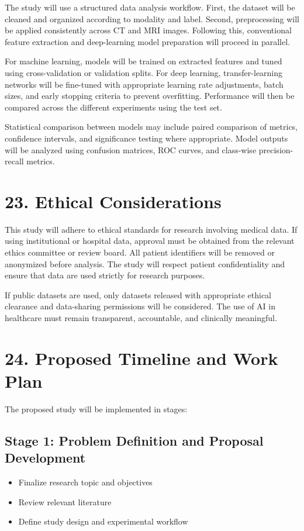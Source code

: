 \documentclass[12pt,a4paper]{report}
\begin{document}
The study will use a structured data analysis workflow. First, the dataset will be cleaned and organized according to modality and label. Second, preprocessing will be applied consistently across CT and MRI images. Following this, conventional feature extraction and deep-learning model preparation will proceed in parallel.

For machine learning, models will be trained on extracted features and tuned using cross-validation or validation splits. For deep learning, transfer-learning networks will be fine-tuned with appropriate learning rate adjustments, batch sizes, and early stopping criteria to prevent overfitting. Performance will then be compared across the different experiments using the test set.

Statistical comparison between models may include paired comparison of metrics, confidence intervals, and significance testing where appropriate. Model outputs will be analyzed using confusion matrices, ROC curves, and class-wise precision-recall metrics.


\section{23. Ethical Considerations}

This study will adhere to ethical standards for research involving medical data. If using institutional or hospital data, approval must be obtained from the relevant ethics committee or review board. All patient identifiers will be removed or anonymized before analysis. The study will respect patient confidentiality and ensure that data are used strictly for research purposes.

If public datasets are used, only datasets released with appropriate ethical clearance and data-sharing permissions will be considered. The use of AI in healthcare must remain transparent, accountable, and clinically meaningful.


\section{24. Proposed Timeline and Work Plan}

The proposed study will be implemented in stages:

\subsection{Stage 1: Problem Definition and Proposal Development}
\begin{itemize}
\item Finalize research topic and objectives
\item Review relevant literature
\item Define study design and experimental workflow
\end{itemize}
\end{document}
